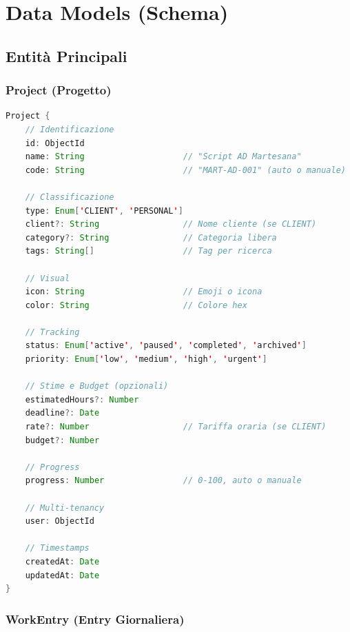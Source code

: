 \documentclass[11pt,a4paper]{article}
\begin{document}
\newpage
\section{Data Models (Schema)}

\subsection{Entità Principali}

\subsubsection{Project (Progetto)}

\begin{lstlisting}[language=Java, caption=Project Schema - Pseudocodice]
Project {
    // Identificazione
    id: ObjectId
    name: String                    // "Script AD Martesana"
    code: String                    // "MART-AD-001" (auto o manuale)
    
    // Classificazione
    type: Enum['CLIENT', 'PERSONAL']
    client?: String                 // Nome cliente (se CLIENT)
    category?: String               // Categoria libera
    tags: String[]                  // Tag per ricerca
    
    // Visual
    icon: String                    // Emoji o icona
    color: String                   // Colore hex
    
    // Tracking
    status: Enum['active', 'paused', 'completed', 'archived']
    priority: Enum['low', 'medium', 'high', 'urgent']
    
    // Stime e Budget (opzionali)
    estimatedHours?: Number
    deadline?: Date
    rate?: Number                   // Tariffa oraria (se CLIENT)
    budget?: Number
    
    // Progress
    progress: Number                // 0-100, auto o manuale
    
    // Multi-tenancy
    user: ObjectId
    
    // Timestamps
    createdAt: Date
    updatedAt: Date
}
\end{lstlisting}

\subsubsection{WorkEntry (Entry Giornaliera)}
\end{document}
